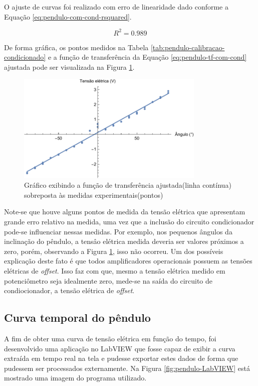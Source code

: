 \documentclass[a4paper]{instrumentacao}
\begin{document}
O ajuste de curvas foi realizado com erro de linearidade dado conforme a Equação \ref{eq:pendulo-com-cond-rsquared}.

\begin{equation}
	R^2 = 0.989
	\label{eq:pendulo-com-cond-rsquared}
\end{equation}

De forma gráfica, os pontos medidos na Tabela \ref{tab:pendulo-calibracao-condicionado} e a função de transferência da Equação \ref{eq:pendulo-tf-com-cond} ajustada pode ser visualizada na Figura \ref{fig:pendulo-tf-com-cond}.

\begin{figure}[H]
\centering
\includegraphics[width=0.8\textwidth]{Pendulo-Condicionado-fit.pdf}
\caption{Gráfico exibindo a função de transferência ajustada(linha contínua) sobreposta às medidas experimentais(pontos)}
\label{fig:pendulo-tf-com-cond}
\end{figure}

Note-se que houve alguns pontos de medida da tensão elétrica que apresentam grande erro relativo na medida, uma vez que a inclusão do circuito condicionador pode-se influenciar nessas medidas. Por exemplo, nos pequenos ângulos da inclinação do pêndulo, a tensâo elétrica medida deveria ser valores próximos a zero, porém, observando a Figura \ref{fig:pendulo-tf-com-cond}, isso não ocorreu. Um dos possíveis explicação deste fato é que todos amplificadores operacionais possuem as tensões elétricas de \textit{offset}. Isso faz com que, mesmo a tensão elétrica medido em potenciômetro seja idealmente zero, mede-se na saída do circuito de condiocionador, a tensão elétrica de \textit{offset}.  

\subsection{Curva temporal do pêndulo}

A fim de obter uma curva de tensão elétrica em função do tempo, foi desenvolvido uma aplicação no LabVIEW que fosse capaz de exibir a curva extraída em tempo real na tela e pudesse exportar estes dados de forma que pudessem ser processados externamente. Na Figura \ref{fig:pendulo-LabVIEW} está mostrado uma imagem do programa utilizado.
\end{document}
